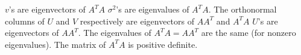 \markdownRendererInterblockSeparator
{}\markdownRendererUlBegin
\markdownRendererUlItem $v$'s are eigenvectors of $A^TA$\markdownRendererUlItemEnd 
\markdownRendererUlItem $\sigma^2$'s are eigenvalues of $A^TA$.\markdownRendererUlItemEnd 
\markdownRendererUlItem The orthonormal columns of $U$ and $V$ respectively are eigenvectors of $AA^T$ and $A^TA$\markdownRendererUlItemEnd 
\markdownRendererUlItem $U$'s are eigenvectors of $AA^T$.\markdownRendererUlItemEnd 
\markdownRendererUlItem The eigenvalues of $A^TA=AA^T$ are the same (for nonzero eigenvalues).\markdownRendererUlItemEnd 
\markdownRendererUlItem The matrix of $A^TA$ is positive definite.\markdownRendererUlItemEnd 
\markdownRendererUlEnd \relax